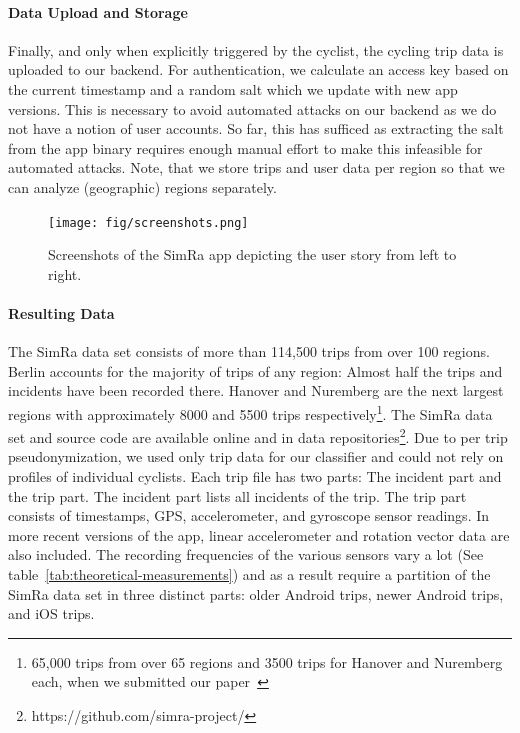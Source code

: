 \paragraph{Data Upload and Storage}
Finally, and only when explicitly triggered by the cyclist, the cycling trip data is uploaded to our backend.
For authentication, we calculate an access key based on the current timestamp and a random salt which we update with new app versions.
This is necessary to avoid automated attacks on our backend as we do not have a notion of user accounts.
So far, this has sufficed as extracting the salt from the app binary requires enough manual effort to make this infeasible for automated attacks.
Note, that we store trips and user data per region so that we can analyze (geographic) regions separately.

\begin{figure}[ht]
	\centering
	\texttt{[image: fig/screenshots.png]}
	\caption{Screenshots of the SimRa app depicting the user story from left to right.}
	\label{fig:user-story}
\end{figure}


\paragraph{Resulting Data}
The SimRa data set consists of more than 114,500 trips from over 100 regions.
Berlin accounts for the majority of trips of any region: Almost half the trips and incidents have been recorded there.
Hanover and Nuremberg are the next largest regions with approximately 8000 and 5500 trips respectively\footnote{65,000 trips from over 65 regions and 3500 trips for Hanover and Nuremberg each, when we submitted our paper~\cite{karakaya2022cyclesense}}.
The SimRa data set and source code are available online and in data repositories\footnote{https://github.com/simra-project/}.
Due to per trip pseudonymization, we used only trip data for our classifier and could not rely on profiles of individual cyclists.
Each trip file has two parts: The incident part and the trip part.
The incident part lists all incidents of the trip.
The trip part consists of timestamps, GPS, accelerometer, and gyroscope sensor readings. In more recent versions of the app, linear accelerometer and rotation vector data are also included.
The recording frequencies of the various sensors vary a lot (See table~\ref{tab:theoretical-measurements}) and as a result require a partition of the SimRa data set in three distinct parts: older Android trips, newer Android trips, and iOS trips.



